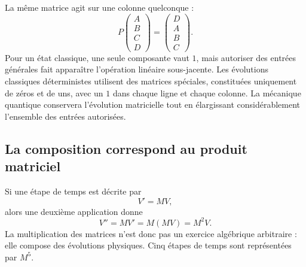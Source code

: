 La même matrice agit sur une colonne quelconque :
\begin{equation}
  P
  \begin{pmatrix}A\\B\\C\\D\end{pmatrix}
  =
  \begin{pmatrix}D\\A\\B\\C\end{pmatrix}.
  \label{eq:l01-cyclic-shift}
\end{equation}
Pour un état classique, une seule composante vaut \(1\), mais autoriser des entrées générales fait apparaître l’opération linéaire sous-jacente. Les évolutions classiques déterministes utilisent des matrices spéciales, constituées uniquement de zéros et de uns, avec un \(1\) dans chaque ligne et chaque colonne. La mécanique quantique conservera l’évolution matricielle tout en élargissant considérablement l’ensemble des entrées autorisées.

\subsection{La composition correspond au produit matriciel}

Si une étape de temps est décrite par
\begin{equation}
  V'=MV,
\end{equation}
alors une deuxième application donne
\begin{equation}
  V''=MV'=M(MV)=M^2V.
  \label{eq:l01-two-updates}
\end{equation}
La multiplication des matrices n’est donc pas un exercice algébrique arbitraire : elle compose des évolutions physiques. Cinq étapes de temps sont représentées par \(M^5\).


